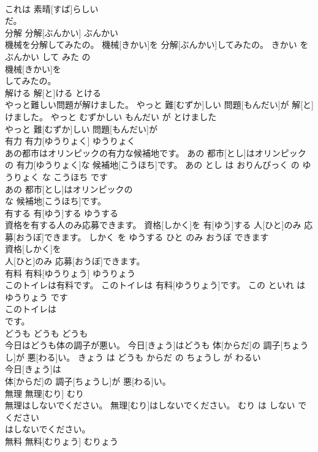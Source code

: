 \documentclass[8pt]{extreport}
\begin{document}
\begin{CJK}{UTF8}{min}
\\	これは 素晴[すば]らしい
\\	だ。			
\\	分解	分解[ぶんかい]	ぶんかい	
\\	機械を分解してみたの。	機械[きかい]を 分解[ぶんかい]してみたの。	きかい を ぶんかい して みた の	
\\	機械[きかい]を
\\	してみたの。			
\\	解ける	解[と]ける	とける	
\\	やっと難しい問題が解けました。	やっと 難[むずか]しい 問題[もんだい]が 解[と]けました。	やっと むずかしい もんだい が とけました	
\\	やっと 難[むずか]しい 問題[もんだい]が
\\	有力	有力[ゆうりょく]	ゆうりょく	
\\	あの都市はオリンピックの有力な候補地です。	あの 都市[とし]はオリンピックの 有力[ゆうりょく]な 候補地[こうほち]です。	あの とし は おりんぴっく の ゆうりょく な こうほち です	
\\	あの 都市[とし]はオリンピックの
\\	な 候補地[こうほち]です。			
\\	有する	有[ゆう]する	ゆうする	
\\	資格を有する人のみ応募できます。	資格[しかく]を 有[ゆう]する 人[ひと]のみ 応募[おうぼ]できます。	しかく を ゆうする ひと のみ おうぼ できます	
\\	資格[しかく]を
\\	人[ひと]のみ 応募[おうぼ]できます。			
\\	有料	有料[ゆうりょう]	ゆうりょう	
\\	このトイレは有料です。	このトイレは 有料[ゆうりょう]です。	この といれ は ゆうりょう です	
\\	このトイレは
\\	です。			
\\	どうも	どうも	どうも	
\\	今日はどうも体の調子が悪い。	今日[きょう]はどうも 体[からだ]の 調子[ちょうし]が 悪[わる]い。	きょう は どうも からだ の ちょうし が わるい	
\\	今日[きょう]は
\\	体[からだ]の 調子[ちょうし]が 悪[わる]い。			
\\	無理	無理[むり]	むり	
\\	無理はしないでください。	無理[むり]はしないでください。	むり は しない で ください	
\\	はしないでください。			
\\	無料	無料[むりょう]	むりょう	

\end{CJK}
\end{document}
